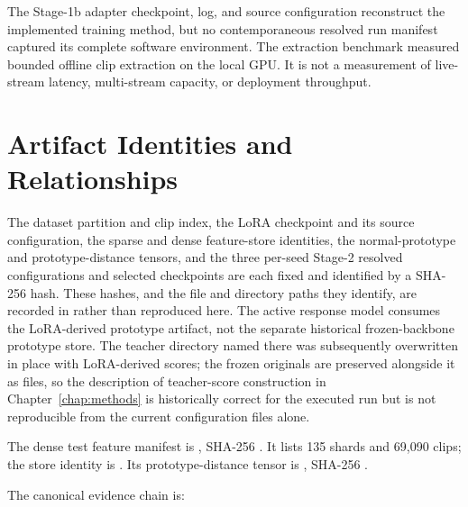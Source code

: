 The Stage-1b adapter checkpoint, log, and source configuration reconstruct the implemented training method, but no contemporaneous resolved run manifest captured its complete software environment. The extraction benchmark measured bounded offline clip extraction on the local GPU. It is not a measurement of live-stream latency, multi-stream capacity, or deployment throughput.

\section{Artifact Identities and Relationships}
\label{app:artifact-identities}

The dataset partition and clip index, the LoRA checkpoint and its source configuration, the sparse and dense feature-store identities, the normal-prototype and prototype-distance tensors, and the three per-seed Stage-2 resolved configurations and selected checkpoints are each fixed and identified by a SHA-256 hash. These hashes, and the file and directory paths they identify, are recorded in  rather than reproduced here. The active response model consumes the LoRA-derived prototype artifact, not the separate historical frozen-backbone prototype store. The teacher directory named there was subsequently overwritten in place with LoRA-derived scores; the frozen originals are preserved alongside it as  files, so the description of teacher-score construction in Chapter~\ref{chap:methods} is historically correct for the executed run but is not reproducible from the current configuration files alone.

The dense test feature manifest is , SHA-256 . It lists 135 shards and 69,090 clips; the store identity is . Its prototype-distance tensor is , SHA-256 .

The canonical evidence chain is:

